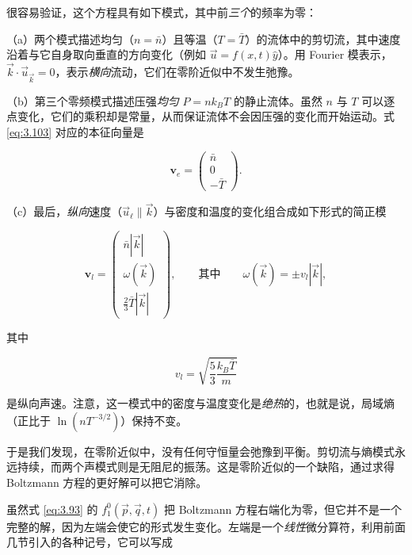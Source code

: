 很容易验证，这个方程具有如下模式，其中前\emph{三个}的频率为零：

（a）两个模式描述均匀（$n=\bar n$）且等温（$T=\bar T$）的流体中的剪切流，其中速度沿着与它自身取向垂直的方向变化（例如 $\vec u=f(x,t)\hat y$）。用 Fourier 模表示，$\vec k\cdot\vec u_{\vec k}=0$，表示\emph{横向}流动，它们在零阶近似中不发生弛豫。

（b）第三个零频模式描述压强\emph{均匀} $P=nk_BT$ 的静止流体。虽然 $n$ 与 $T$ 可以逐点变化，它们的乘积却是常量，从而保证流体不会因压强的变化而开始运动。式 \eqref{eq:3.103} 对应的本征向量是

\begin{equation}\label{eq:3.104}
  \mathbf v_e=\begin{pmatrix}\bar n\\ 0\\ -\bar T\end{pmatrix}.
\end{equation}

（c）最后，\emph{纵向}速度（$\vec u_\ell\parallel\vec k$）与密度和温度的变化组合成如下形式的简正模

\begin{equation}\label{eq:3.105}
  \mathbf v_l=\begin{pmatrix}\bar n|\vec k|\\ \omega(\vec k)\\ \frac{2}{3}\bar T|\vec k|\end{pmatrix},\qquad\text{其中}\qquad\omega(\vec k)=\pm v_l|\vec k|,
\end{equation}

其中

\begin{equation}\label{eq:3.106}
  v_l=\sqrt{\frac{5}{3}\frac{k_B\bar T}{m}}
\end{equation}

是纵向声速。注意，这一模式中的密度与温度变化是\emph{绝热}的，也就是说，局域熵（正比于 $\ln(nT^{-3/2})$）保持不变。

于是我们发现，在零阶近似中，没有任何守恒量会弛豫到平衡。剪切流与熵模式永远持续，而两个声模式则是无阻尼的振荡。这是零阶近似的一个缺陷，通过求得 Boltzmann 方程的更好解可以把它消除。


虽然式 \eqref{eq:3.93} 的 $f_1^0(\vec p,\vec q,t)$ 把 Boltzmann 方程右端化为零，但它并不是一个完整的解，因为左端会使它的形式发生变化。左端是一个\emph{线性}微分算符，利用前面几节引入的各种记号，它可以写成

